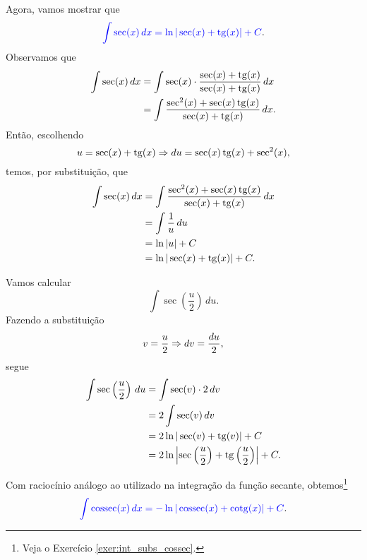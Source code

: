 Agora, vamos mostrar que
\begin{equation}
  {\color{blue}\int \sec(x)\,dx = \ln|\sec(x)+\operatorname{tg}(x)|+C}.
\end{equation}
Observamos que
\begin{align}
  \int\sec(x)\,dx &= \int \sec(x)\cdot\frac{\sec(x)+\operatorname{tg}(x)}{\sec(x)+\operatorname{tg}(x)}\,dx \\
                  &= \int \frac{\sec^2(x)+\sec(x)\operatorname{tg}(x)}{\sec(x)+\operatorname{tg}(x)}\,dx.
\end{align}
Então, escolhendo
\begin{equation}
  u = \sec(x) + \operatorname{tg}(x)\\
  \Rightarrow du = \sec(x)\operatorname{tg}(x) + \sec^2(x),
\end{equation}
temos, por substituição, que
\begin{align}
  \int\sec(x)\,dx &= \int\frac{\sec^2(x)+\sec(x)\operatorname{tg}(x)}{\sec(x)+\operatorname{tg}(x)}\,dx \\
                  &= \int\frac{1}{u}\,du \\
                  &= \ln|u| + C \\
                  &= \ln|\sec(x)+\operatorname{tg}(x)| + C.
\end{align}

\begin{ex}
  Vamos calcular
  \begin{equation}
    \int\sec\left(\frac{u}{2}\right)\,du.
  \end{equation}
  Fazendo a substituição
  \begin{equation}
    v = \frac{u}{2}\\
    \Rightarrow dv = \frac{du}{2},
  \end{equation}
  segue
  \begin{align}
    \int\sec\left(\frac{u}{2}\right)\,du &= \int\sec(v)\cdot 2\,dv \\
                                         &= 2\int \sec(v)\,dv \\
                                         &= 2\ln|\sec(v)+\operatorname{tg}(v)| + C \\
                                         &= 2\ln\left|\sec\left(\frac{u}{2}\right)+\operatorname{tg}\left(\frac{u}{2}\right)\right| + C.
  \end{align}
\end{ex}

Com raciocínio análogo ao utilizado na integração da função secante, obtemos\footnote{Veja o Exercício \ref{exer:int_subs_cossec}.}
\begin{equation}
  {\color{blue}\int \operatorname{cossec}(x)\,dx = -\ln|\operatorname{cossec}(x)+\operatorname{cotg}(x)| + C}.
\end{equation}



